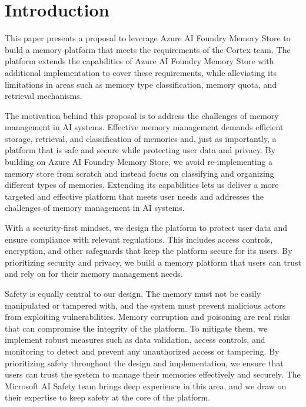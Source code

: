 \documentclass[9pt]{extarticle}%
\begin{document}
\section{Introduction}%
This paper presents a proposal to leverage Azure AI Foundry Memory Store to build a memory platform that meets the requirements of the Cortex team. The platform extends the capabilities of Azure AI Foundry Memory Store with additional implementation to cover these requirements, while alleviating its limitations in areas such as memory type classification, memory quota, and retrieval mechanisms.
%
\par\vspace{\baselineskip}%
The motivation behind this proposal is to address the challenges of memory management in AI systems. Effective memory management demands efficient storage, retrieval, and classification of memories and, just as importantly, a platform that is safe and secure while protecting user data and privacy. By building on Azure AI Foundry Memory Store, we avoid re-implementing a memory store from scratch and instead focus on classifying and organizing different types of memories. Extending its capabilities lets us deliver a more targeted and effective platform that meets user needs and addresses the challenges of memory management in AI systems.
%
\par\vspace{\baselineskip}%
With a security-first mindset, we design the platform to protect user data and ensure compliance with relevant regulations. This includes access controls, encryption, and other safeguards that keep the platform secure for its users. By prioritizing security and privacy, we build a memory platform that users can trust and rely on for their memory management needs.
%
\par\vspace{\baselineskip}%
Safety is equally central to our design. The memory must not be easily manipulated or tampered with, and the system must prevent malicious actors from exploiting vulnerabilities. Memory corruption and poisoning are real risks that can compromise the integrity of the platform. To mitigate them, we implement robust measures such as data validation, access controls, and monitoring to detect and prevent any unauthorized access or tampering. By prioritizing safety throughout the design and implementation, we ensure that users can trust the system to manage their memories effectively and securely. The Microsoft AI Safety team brings deep experience in this area, and we draw on their expertise to keep safety at the core of the platform.
\end{document}
